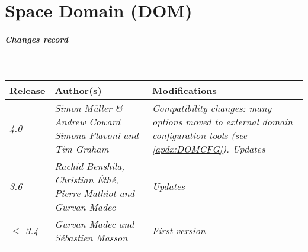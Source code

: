 \documentclass[../main/NEMO_manual]{subfiles}
\begin{document}
\chapter{Space Domain (DOM)}
\label{chap:DOM}


\chaptertoc

\paragraph{Changes record} ~\\

{\footnotesize
  \begin{tabularx}{0.8\textwidth}{l||X|X}
    Release                                                                                 &
    Author(s)                                                                               &
    Modifications                                                                           \\
    \hline
    {\em 4.0                                                                              } &
    {\em Simon M\"{u}ller \& Andrew Coward \newline \newline
      Simona Flavoni and Tim Graham                                                       } &
    {\em Compatibility changes: many options moved to external domain configuration tools
      (see \autoref{apdx:DOMCFG}). \newline
      Updates                                                                             } \\
    {\em 3.6                                                                              } &
    {\em Rachid Benshila, Christian \'{E}th\'{e}, Pierre Mathiot and Gurvan Madec         } &
    {\em Updates                                                                          } \\
    {\em $\leq$ 3.4                                                                       } &
    {\em Gurvan Madec and S\'{e}bastien Masson                                            } &
    {\em First version                                                                    }
  \end{tabularx}
}
\end{document}
